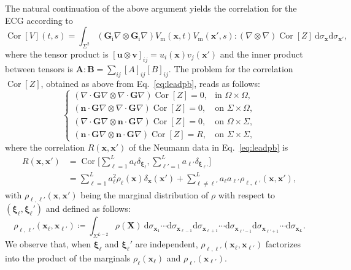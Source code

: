 \documentclass[runningheads]{llncs}
\newcommand{\bs}[1]{\boldsymbol{#1}}
\newcommand{\Vm}{V_\mathrm{m}}
\newcommand{\vX}{\mathbf{X}}
\newcommand{\vx}{\mathbf{x}}
\newcommand{\vn}{\mathbf{n}}
\newcommand{\tG}{\mathbf{G}}
\newcommand{\tGi}{\tG_\mathrm{i}}
\newcommand{\dd}{\mathrm{d}}
\DeclareMathOperator{\Cor}{Cor}
\begin{document}
The natural continuation of the above argument yields the correlation for
the ECG according to
\[
\Cor[V](t,s) 
= \int_{\Sigma^2} (\tGi\nabla\otimes\tGi\nabla) \Vm(\vx,t)\Vm(\vx',s)
: (\nabla\otimes\nabla) \Cor[Z]\: \dd\sigma_{\vx}\dd\sigma_{\vx'},
\]
where the tensor product is $[\mathbf{u}\otimes\mathbf{v}]_{ij} = u_i(\vx)
v_j(\vx')$ and the inner product between tensors is $\mathbf{A}:\mathbf{B}
= \sum_{ij} [A]_{ij} [B]_{ij}$.  The problem for the correlation $\Cor[Z]$,
obtained as above from Eq.~\eqref{eq:leadpb}, reads as follows:
\begin{equation}\label{eq:leadpb_cor}
\begin{cases}
(\nabla\cdot\tG\nabla\otimes \nabla\cdot\tG\nabla) \Cor[Z] = 0, & \text{in }
\Omega\times\Omega, \\
(\vn\cdot\tG\nabla \otimes \nabla\cdot\tG\nabla) \Cor[Z] = 0, &
\text{on } \Sigma\times\Omega, \\
(\nabla\cdot\tG\nabla \otimes \vn\cdot\tG\nabla) \Cor[Z] = 0, &
\text{on } \Omega\times\Sigma, \\
(\vn\cdot\tG\nabla \otimes \vn\cdot\tG\nabla) \Cor[Z] = R, &
\text{on }\Sigma\times\Sigma,
\end{cases}
\end{equation}
where the correlation $R(\vx,\vx')$ of the Neumann data in
Eq.~\eqref{eq:leadpb} is
\begin{equation}
\begin{split}
R(\vx,\vx') &= \Cor\biggl[\sum_{\ell=1}^L a_\ell \delta_{{\bs\xi}_\ell},
\sum_{\ell'=1}^L a_{\ell'} \delta_{{\bs\xi}_{\ell'}} \biggr] \\
&= \sum_{\ell=1}^L a_\ell^2 \rho_\ell(\vx)\delta_{\vx}(\vx')
+ \sum_{\ell\neq\ell'}^L a_\ell a_{\ell'} \rho_{\ell,\ell'}(\vx,\vx'),
\end{split}
\end{equation}
with $\rho_{\ell,\ell'}(\vx,\vx')$ being the marginal distribution
of $\rho$ with respect to $(\bs\xi_\ell,\bs\xi_\ell')$ and defined
as follows:
\begin{equation} \label{eq:margin2}
\rho_{\ell,\ell'}(\vx_\ell,\vx_{\ell'}) \coloneqq
\int_{\Sigma^{L-2}} \rho(\vX)\:\dd\sigma_{\vx_1}
\cdots \dd\sigma_{\vx_{\ell-1}}\dd\sigma_{\vx_{\ell+1}}
\cdots \dd\sigma_{\vx_{\ell'-1}}\dd\sigma_{\vx_{\ell'+1}}\cdots
\dd\sigma_{\vx_L}.
\end{equation}
We observe that, when $\bs\xi_\ell$ and $\bs\xi_\ell'$ are independent,
$\rho_{\ell,\ell'}(\vx_\ell,\vx_{\ell'})$ factorizes into the product
of the marginals $\rho_\ell(\vx_\ell)$ and $\rho_{\ell'}(\vx_{\ell'})$.
\end{document}
